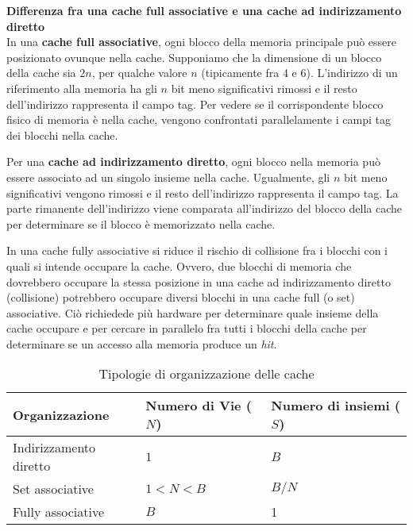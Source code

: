\begin{exmp}
    \textbf{Differenza fra una cache full associative e una cache ad
    indirizzamento diretto} \\
    In una \textbf{cache full associative}, ogni blocco della memoria principale
    può essere posizionato ovunque nella cache. Supponiamo che la dimensione di
    un blocco della cache sia $2n$, per qualche valore $n$ (tipicamente fra 4 e
    6). L'indirizzo di un riferimento alla memoria ha gli $n$ bit meno
    significativi rimossi e il resto dell'indirizzo rappresenta il campo tag.
    Per vedere se il corrispondente blocco fisico di memoria è nella cache,
    vengono confrontati parallelamente i campi tag dei blocchi nella cache.

    Per una \textbf{cache ad indirizzamento diretto}, ogni blocco nella memoria
    può essere associato ad un singolo insieme nella cache. Ugualmente, gli $n$
    bit meno significativi vengono rimossi e il resto dell'indirizzo rappresenta
    il campo tag. La parte rimanente dell'indirizzo viene comparata
    all'indirizzo del blocco della cache per determinare se il blocco è
    memorizzato nella cache.

    In una cache fully associative si riduce il rischio di collisione fra i
    blocchi con i quali si intende occupare la cache. Ovvero, due blocchi di
    memoria che dovrebbero occupare la stessa posizione in una cache ad
    indirizzamento diretto (collisione) potrebbero occupare diversi blocchi in
    una cache full (o set) associative. Ciò richiedede più hardware per
    determinare quale insieme della cache occupare e per cercare in parallelo
    fra tutti i blocchi della cache per determinare se un accesso alla memoria
    produce un \textit{hit}.

    \begin{table}[htbp]
        \centering
        \caption{Tipologie di organizzazione delle cache}
        \label{tab:caches}
        \begin{tabular}{|l|l|l|}
        \hline
        Organizzazione         & Numero di Vie ($N$) & Numero di insiemi ($S$)
        \\ \hline
        Indirizzamento diretto & $1$                 & $B$ \\ \hline
        Set associative        & $1 < N < B$         & $B/N$ \\ \hline
        Fully associative      & $B$                 & 1 \\ \hline
        \end{tabular}
    \end{table}
\end{exmp}


